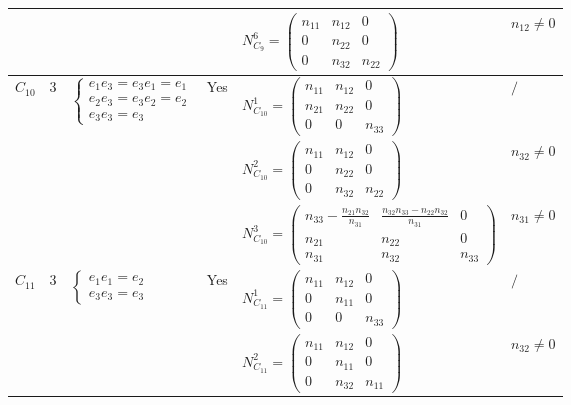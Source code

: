 \documentclass[12pt, reqno]{amsart}
\theoremstyle{plain}
\begin{document}
\begin{table}[H]
\begin{tabular}{|c|c|l|l|l|l|}
    & & & & $N_{C_9}^6 = \begin{pmatrix} n_{11} & n_{12} & 0 \\ 0 & n_{22} & 0 \\ 0 & n_{32} & n_{22} \end{pmatrix}$ & $n_{12}\neq0$ \\
    \hline
    \multirow{3}{*}{$C_{10}$} & \multirow{3}{*}{3} & \multirow{3}{*}{$\begin{cases} e_1 e_3 = e_3 e_1 = e_1 \\ e_2 e_3 = e_3 e_2 = e_2 \\ e_3 e_3 = e_3 \end{cases}$} & \multirow{3}{*}{Yes} & 
    $N_{C_{10}}^1 = \begin{pmatrix} n_{11} & n_{12} & 0 \\ n_{21} & n_{22} & 0 \\ 0 & 0 & n_{33} \end{pmatrix}$ & $/$ \\
    & & & & $N_{C_{10}}^2 = \begin{pmatrix} n_{11} & n_{12} & 0 \\ 0 & n_{22} & 0 \\ 0 & n_{32} & n_{22} \end{pmatrix}$ & $n_{32}\neq0$ \\
    & & & & $N_{C_{10}}^3 = \begin{pmatrix} n_{33}-\frac{n_{21}n_{32}}{n_{31}} & \frac{n_{32}n_{33}-n_{22}n_{32}}{n_{31}} & 0 \\ n_{21} & n_{22} & 0 \\ n_{31} & n_{32} & n_{33} \end{pmatrix}$ & $n_{31}\neq0$ \\
    \hline
    \multirow{3}{*}{$C_{11}$} & \multirow{3}{*}{3} & \multirow{3}{*}{$\begin{cases} e_1 e_1 = e_2 \\ e_3 e_3 = e_3 \end{cases}$} & \multirow{3}{*}{Yes} & 
    $N_{C_{11}}^1 = \begin{pmatrix} n_{11} & n_{12} & 0 \\ 0 & n_{11} & 0 \\ 0 & 0 & n_{33} \end{pmatrix}$ & $/$ \\
    & & & & $N_{C_{11}}^2 = \begin{pmatrix} n_{11} & n_{12} & 0 \\ 0 & n_{11} & 0 \\ 0 & n_{32} & n_{11} \end{pmatrix}$ & $n_{32}\neq0$ \\

\end{tabular}
\end{table}
\end{document}

